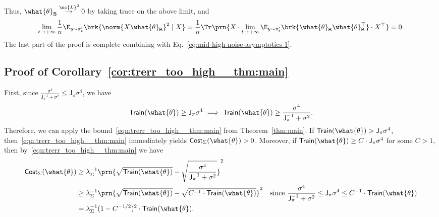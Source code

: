 \documentclass[11pt]{article}
\newcommand{\bysest}{\what{\theta}_{\mathsf{B}}}
\newcommand{\trerr}{\mathsf{Train}}
\newcommand{\cost}{\mathsf{Cost}}
\newcommand{\jfunc}{\mathsf{J}}
\begin{document}
Thus, $\bysest \stackrel{\mc{L}^2}{\rightarrow} 0$ by taking trace on the above limit, and
\begin{align*}
    \lim_{t \to +\infty} \frac{1}{n} \E_{y \sim \pi_t'}\brk{\norm{X \bysest}^2  \mid X} = \frac{1}{n} \Tr \prn{X \cdot \lim_{t \to +\infty} \E_{y \sim \pi_{t}'} \brk{\bysest \bysest^\top} \cdot X^\top } = 0.
\end{align*}
The last part of the proof is complete combining with Eq.~\eqref{eq:mid-high-noise-asymptotics-1}.

\subsection{Proof of Corollary~\ref{cor:trerr_too_high__thm:main}}
First, since $\frac{\sigma^4}{\jfunc_\pi^{-1}+\sigma^2} \leq \jfunc_\pi \sigma^4$,
we have
\[\trerr(\what{\theta}) \geq \jfunc_\pi\sigma^4 \ \Longrightarrow \ \trerr(\what{\theta})\geq \frac{\sigma^4}{\jfunc_\pi^{-1}+\sigma^2}.\]
Therefore, we can apply the bound~\eqref{eqn:trerr_too_high__thm:main} from Theorem~\ref{thm:main}. If $\trerr(\what{\theta}) > \jfunc_\pi\sigma^4$, then~\eqref{eqn:trerr_too_high__thm:main} immediately yields $\cost_\Sigma(\what{\theta})>0$. Moreover, if 
$\trerr(\what{\theta}) \geq C\cdot  \jfunc_\pi\sigma^4$ for some $C>1$, then by~\eqref{eqn:trerr_too_high__thm:main} we have
\begin{align*}
    \cost_\Sigma(\what{\theta})
    &\geq \lambda_\Sigma^{-1}\prn{\sqrt{\trerr(\what{\theta})}-\sqrt{\frac{\sigma^4}{\jfunc_\pi^{-1}+\sigma^2}}}^2\\
    &\geq \lambda_\Sigma^{-1}\prn{\sqrt{\trerr(\what{\theta})}-\sqrt{C^{-1}\cdot \trerr(\what{\theta})}}^2\textnormal{\quad since $\frac{\sigma^4}{\jfunc_\pi^{-1}+\sigma^2} \leq \jfunc_\pi\sigma^4\leq C^{-1}\cdot \trerr(\what{\theta})$}\\
    &=\lambda_\Sigma^{-1}(1-C^{-1/2})^2 \cdot \trerr(\what{\theta}).
\end{align*}
\end{document}
